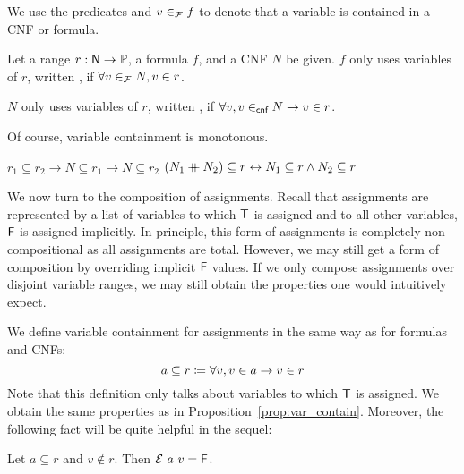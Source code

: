 %
We use the predicates  and $v \in_{\mathcal{F}} f$ to denote that a variable is contained in a CNF or formula.
%

\begin{definition}
  Let a range $r : \mathsf{N} \rightarrow \mathbb{P}$, a formula $f$, and a CNF $N$ be given. 
  $f$ only uses variables of $r$, written , if $\forall v\in_{\mathcal{F}} N, v \in r$.


  $N$ only uses variables of $r$, written , if $\forall v, v \in_{\textsf{cnf}} N \rightarrow v \in r$. 
\end{definition}

Of course, variable containment is monotonous. 
\begin{proposition}\label{prop:var_contain}\leavevmode
  \begin{enumerate}
     $r_1 \subseteq r_2 \rightarrow N \subseteq r_1 \rightarrow N \subseteq r_2$
     $(N_1 \mathbin{+\mkern-10mu+} N_2) \subseteq r \leftrightarrow N_1 \subseteq r \land N_2 \subseteq r$
  \end{enumerate}
\end{proposition}

We now turn to the composition of assignments. Recall that assignments are represented by a list of variables to which $\mathsf{T}$ is assigned and to all other variables, $\mathsf{F}$ is assigned implicitly. 
In principle, this form of assignments is completely non-compositional as all assignments are total. 
However, we may still get a form of composition by overriding implicit $\mathsf{F}$ values. If we only compose assignments over disjoint variable ranges, we may still obtain the properties one would intuitively expect. 

We define variable containment  for assignments in the same way as for formulas and CNFs:
\[a \subseteq r \coloneqq \forall v, v \in a \rightarrow v \in r \]
Note that this definition only talks about variables to which $\mathsf{T}$ is assigned.
We obtain the same properties as in Proposition~\ref{prop:var_contain}.
Moreover, the following fact will be quite helpful in the sequel:
\begin{fact}
  Let $a \subseteq r$ and $v \notin r$. Then $\mathcal{E}~a~v = \mathsf{F}$.
\end{fact}

